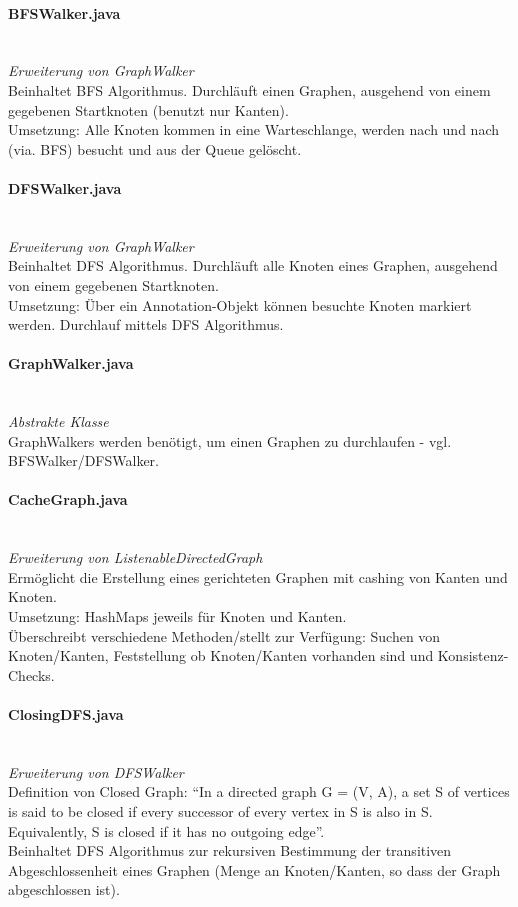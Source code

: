 \documentclass[10pt,a4paper]{article}
\begin{document}
\paragraph{BFSWalker.java}\ \\
\emph{Erweiterung von GraphWalker}\\
Beinhaltet BFS Algorithmus. Durchläuft einen Graphen, ausgehend von einem gegebenen Startknoten (benutzt nur Kanten).\\
Umsetzung: Alle Knoten kommen in eine Warteschlange, werden nach und nach (via. BFS) besucht und aus der Queue gelöscht.\\

\paragraph{DFSWalker.java}\ \\
\emph{Erweiterung von GraphWalker}\\
Beinhaltet DFS Algorithmus. Durchläuft alle Knoten eines Graphen, ausgehend von einem gegebenen Startknoten.\\
Umsetzung: Über ein Annotation-Objekt können besuchte Knoten markiert werden. Durchlauf mittels DFS Algorithmus.\\

\paragraph{GraphWalker.java}\ \\
\emph{Abstrakte Klasse}\\
GraphWalkers werden benötigt, um einen Graphen zu durchlaufen - vgl. BFSWalker/DFSWalker. \\

\paragraph{CacheGraph.java}\ \\
\emph{Erweiterung von ListenableDirectedGraph}\\
Ermöglicht die Erstellung eines gerichteten Graphen mit cashing von Kanten und Knoten.\\
Umsetzung: HashMaps jeweils für Knoten und Kanten.\\
Überschreibt verschiedene Methoden/stellt zur Verfügung: Suchen von Knoten/Kanten, Feststellung ob Knoten/Kanten vorhanden sind und Konsistenz-Checks.\\

\paragraph{ClosingDFS.java}\ \\
\emph{Erweiterung von DFSWalker}\\
Definition von Closed Graph: "`In a directed graph G = (V, A), a set S of vertices is said to be closed if every successor of every vertex in S is also in S. Equivalently, S is closed if it has no outgoing edge"'.\\
Beinhaltet DFS Algorithmus zur rekursiven Bestimmung der transitiven Abgeschlossenheit eines Graphen (Menge an Knoten/Kanten, so dass der Graph abgeschlossen ist).\\
\end{document}
